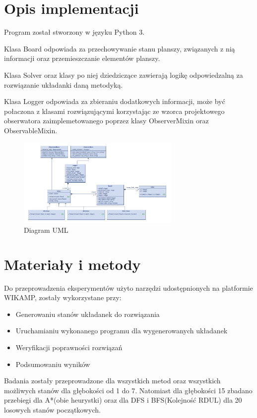 \documentclass{classrep}
\begin{document}
    \section{Opis implementacji}
    {
        Program został stworzony w języku Python 3.

        Klasa Board odpowiada za przechowywanie stanu planszy, związanych z nią informacji oraz przemieszczanie elementów planszy.

    Klasa Solver oraz klasy po niej dziedziczące zawierają logikę odpowiedzalną za rozwiązanie układanki daną metodyką.

    Klasa Logger odpowiada za zbieraniu dodatkowych informacji, może być połaczona z klasami rozwiązującymi korzystając ze wzorca projektowego obserwatora zaimplemetowanego poprzez klasy ObserverMixin oraz ObservableMixin.

        \begin{figure}[!htb]
            \centering
            \includegraphics[width=0.7\textwidth,keepaspectratio]{diagram}
            \caption{Diagram UML}
            \label{fig:Diagram UML}
        \end{figure}
     \label{sec:opis-implementacji}}


    \section{Materiały i metody}
    {
        Do przeprowadzenia eksperymentów użyto narzędzi udostępnionych na platformie WIKAMP,
        zostały wykorzystane przy:
        \begin{itemize}
            \item Generowaniu stanów układanek do rozwiązania
            \item Uruchamianiu wykonanego programu dla wygenerowanych układanek
            \item Weryfikacji poprawności rozwiązań
            \item Podsumowaniu wyników
        \end{itemize}
        Badania zostały przeprowadzone dla wszystkich metod oraz wszystkich możliwych stanów dla
        głębokości od 1 do 7. Natomiast dla głębokości 15 zbadano przebiegi dla A*(obie heurystki)
        oraz dla DFS i BFS(Kolejność RDUL) dla 20 losowych stanów początkowych.
    }\label{sec:materiay-i-metody}
\end{document}
